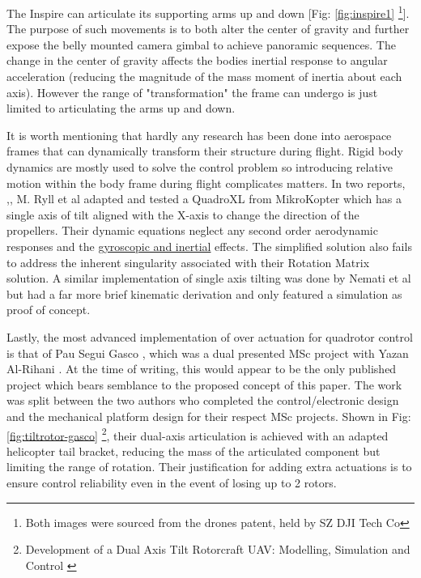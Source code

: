 The Inspire can articulate its supporting arms up and down [Fig: \ref{fig:inspire1} \footnote{Both images were sourced from the drones patent, held by SZ DJI Tech Co\cite{djinspire}}]. The purpose of such movements is to both alter the center of gravity and further expose the belly mounted camera gimbal to achieve panoramic sequences. The change in the center of gravity affects the bodies inertial response to angular acceleration (reducing the magnitude of the mass moment of inertia about each axis). However the range of "transformation" the frame can undergo is just limited to articulating the arms up and down.
\par
It is worth mentioning that  hardly any research has been done into aerospace frames that can dynamically transform their structure during flight. Rigid body dynamics are mostly used to solve the control problem so introducing relative motion within the body frame during flight complicates matters. In two reports, \cite{tiltpropellercontrol},\cite{tiltpropellerflight}, M. Ryll et al adapted and tested a QuadroXL from MikroKopter \cite{mikrokopter} which has a single axis of tilt aligned with the X-axis to change the direction of the propellers. Their dynamic equations neglect any second order aerodynamic responses and the \underline{gyroscopic and inertial} effects. The simplified solution also fails to address the inherent singularity associated with their Rotation Matrix solution. A similar implementation of single axis tilting was done by Nemati et al \cite{singleaxistilting} but had a far more brief kinematic derivation and only featured a simulation as proof of concept.
\par
Lastly, the most advanced implementation of over actuation for quadrotor control is that of Pau Segui Gasco \cite{tiltgasco}, which was a dual presented MSc project with Yazan Al-Rihani \cite{tiltrihani}. At the time of writing, this would appear to be the only published project which bears semblance to the proposed concept of this paper. The work was split between the two authors who completed the control/electronic design and the mechanical platform design for their respect MSc projects. Shown in Fig:\ref{fig:tiltrotor-gasco} \footnote{Development of a Dual Axis Tilt Rotorcraft UAV: Modelling, Simulation and Control \cite{tiltgasco}}, their dual-axis articulation is achieved with an adapted helicopter tail bracket, reducing the mass of the articulated component but limiting the range of rotation. Their justification for adding extra actuations is to ensure control reliability even in the event of losing up to 2 rotors.
